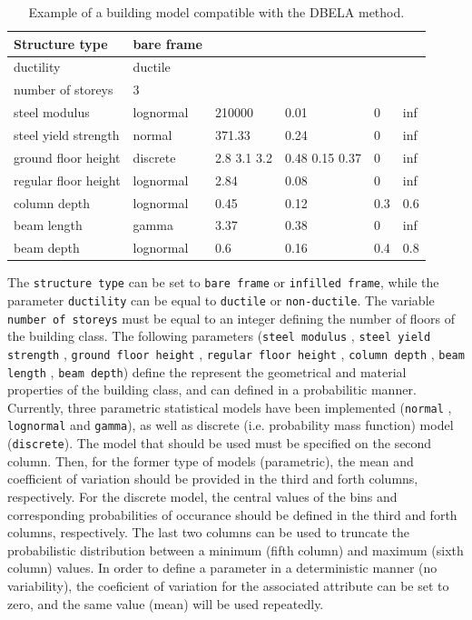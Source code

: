 \begin {table}[htb]
\caption{Example of a building model compatible with the DBELA method.} 
\label{table:building_model} 
\begin{center}
  \begin{tabular}{ | l | l | l | l | l | l |}
  \hline
Structure type & bare frame &  &  &  &  \\ \hline
ductility & ductile &  &  &  &  \\ \hline
number of storeys & 3 &  &  &  &  \\ \hline
steel modulus & lognormal & 210000 & 0.01 & 0 & inf \\ \hline
steel yield strength & normal & 371.33 & 0.24 & 0 & inf \\ \hline
ground floor height & discrete & 2.8 3.1 3.2 & 0.48 0.15 0.37 & 0 & inf \\ \hline
regular floor height & lognormal & 2.84 & 0.08 & 0 & inf \\ \hline
column depth & lognormal & 0.45 & 0.12 & 0.3 & 0.6 \\ \hline
beam length & gamma & 3.37 & 0.38 & 0 & inf \\ \hline
beam depth & lognormal & 0.6 & 0.16 & 0.4 & 0.8 \\ \hline
  \end{tabular}
\end{center}
\end{table}

The \verb=structure type= can be set to \verb=bare frame= or \verb=infilled frame=, while the parameter \verb=ductility= can be equal to \verb=ductile= or \verb=non-ductile=. The variable \verb=number of storeys= must be equal to an integer defining the number of floors of the building class. The following parameters (\verb=steel modulus= , \verb=steel yield strength= , \verb=ground floor height= , \verb=regular floor height= , \verb=column depth= , \verb=beam length= , \verb=beam depth=) define the represent the geometrical and material properties of the building class, and can defined in a probabilitic manner. Currently, three parametric statistical models have been implemented (\verb=normal= , \verb=lognormal= and \verb=gamma=), as well as discrete (i.e. probability mass function) model (\verb=discrete=). The model that should be used must be specified on the second column. Then, for the former type of models (parametric), the mean and coefficient of variation should be provided in the third and forth columns, respectively. For the discrete model, the central values of the bins and corresponding probabilities of occurance should be defined in the third and forth columns, respectively. The last two columns can be used to truncate the probabilistic distribution between a minimum (fifth column) and maximum (sixth column) values. In order to define a parameter in a deterministic manner (no variability), the coeficient of variation for the associated attribute can be set to zero, and the same value (mean) will be used repeatedly.\\


